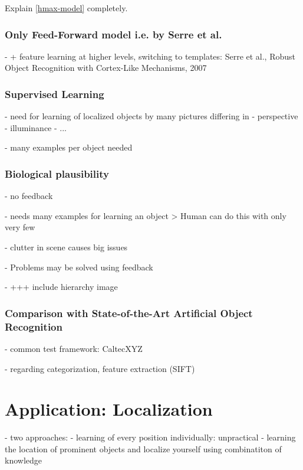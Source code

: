 		Explain \autoref{hmax-model} completely.
		
		\subsection{Only Feed-Forward model i.e. by Serre et al.}
		
			- + feature learning at higher levels, switching to templates: Serre et al., Robust Object Recognition with Cortex-Like Mechanisms, 2007
			
		\subsection{Supervised Learning}
		
			- need for learning of localized objects by many pictures differing in
				- perspective
				- illuminance
				- ...
			
			- many examples per object needed
		
		\subsection{Biological plausibility}
		
			- no feedback
			
			- needs many examples for learning an object
				> Human can do this with only very few
			
			- clutter in scene causes big issues
			
			- Problems may be solved using feedback

			- +++ include hierarchy image

		\subsection{Comparison with State-of-the-Art Artificial Object Recognition}
		
			- common test framework: CaltecXYZ
		
			- regarding categorization, feature extraction (SIFT)
			
			\citep{serre2007robust}
 
\chapter{Application: Localization}

	- two approaches:
		- learning of every position individually: unpractical
		- learning the location of prominent objects and localize yourself using combinatiton of knowledge

